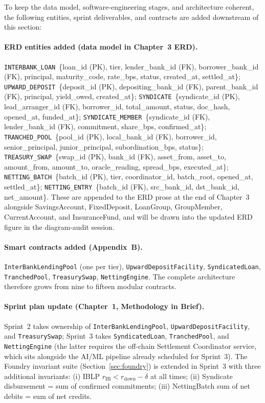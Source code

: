 \documentclass[12pt,a4paper]{report}
\begin{document}
To keep the data model, software-engineering stages, and architecture coherent, the following entities, sprint deliverables, and contracts are added downstream of this section:

\paragraph{ERD entities added (data model in Chapter~3 ERD).}
\texttt{INTERBANK\_LOAN}~\{loan\_id (PK), tier, lender\_bank\_id (FK), borrower\_bank\_id (FK), principal, maturity\_code, rate\_bps, status, created\_at, settled\_at\}; \texttt{UPWARD\_DEPOSIT}~\{deposit\_id (PK), depositing\_bank\_id (FK), parent\_bank\_id (FK), principal, yield\_owed, created\_at\}; \texttt{SYNDICATE}~\{syndicate\_id (PK), lead\_arranger\_id (FK), borrower\_id, total\_amount, status, doc\_hash, opened\_at, funded\_at\}; \texttt{SYNDICATE\_MEMBER}~\{syndicate\_id (FK), lender\_bank\_id (FK), commitment, share\_bps, confirmed\_at\}; \texttt{TRANCHED\_POOL}~\{pool\_id (PK), local\_bank\_id (FK), borrower\_id, senior\_principal, junior\_principal, subordination\_bps, status\}; \texttt{TREASURY\_SWAP}~\{swap\_id (PK), bank\_id (FK), asset\_from, asset\_to, amount\_from, amount\_to, oracle\_reading, spread\_bps, executed\_at\}; \texttt{NETTING\_BATCH}~\{batch\_id (PK), tier, coordinator\_id, batch\_root, opened\_at, settled\_at\}; \texttt{NETTING\_ENTRY}~\{batch\_id (FK), src\_bank\_id, dst\_bank\_id, net\_amount\}. These are appended to the ERD prose at the end of Chapter~3 alongside SavingsAccount, FixedDeposit, LoanGroup, GroupMember, CurrentAccount, and InsuranceFund, and will be drawn into the updated ERD figure in the diagram-audit session.

\paragraph{Smart contracts added (Appendix~B).}
\texttt{InterBankLendingPool} (one per tier), \texttt{UpwardDepositFacility}, \texttt{SyndicatedLoan}, \texttt{TranchedPool}, \texttt{TreasurySwap}, \texttt{NettingEngine}. The complete architecture therefore grows from nine to fifteen modular contracts.

\paragraph{Sprint plan update (Chapter~1, Methodology in Brief).}
Sprint~2 takes ownership of \texttt{InterBankLendingPool}, \texttt{UpwardDepositFacility}, and \texttt{TreasurySwap}; Sprint~3 takes \texttt{SyndicatedLoan}, \texttt{TranchedPool}, and \texttt{NettingEngine} (the latter requires the off-chain Settlement Coordinator service, which sits alongside the AI/ML pipeline already scheduled for Sprint~3). The Foundry invariant suite (Section~\ref{sec:foundry}) is extended in Sprint~3 with three additional invariants: (i) IBLP $r_{\text{IB}} < r_{\text{down}} - \delta$ at all times; (ii) Syndicate disbursement = sum of confirmed commitments; (iii) NettingBatch sum of net debits = sum of net credits.
\end{document}
